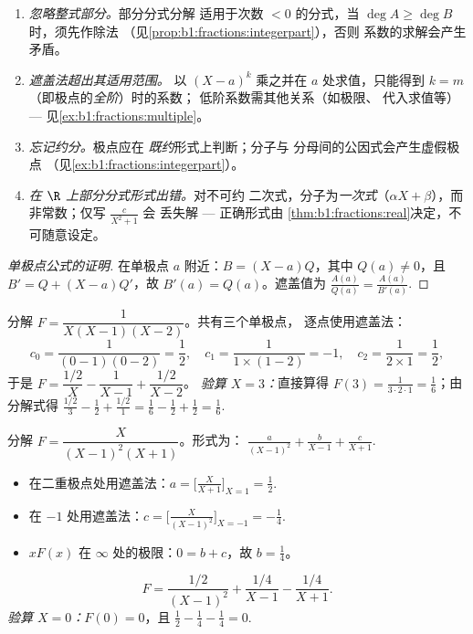 \begin{remark}[部分分式的常见易错点]\label{rem:b1:fractions:pitfalls}
\begin{enumerate}
  \item \emph{忽略整式部分。}部分分式分解
        适用于次数 $< 0$ 的分式，当 $\deg A \geq
        \deg B$ 时，须先作除法
        （见\cref{prop:b1:fractions:integerpart}），否则
        系数的求解会产生矛盾。
  \item \emph{遮盖法超出其适用范围。}
        以 $(X - a)^k$ 乘之并在 $a$ 处求值，只能得到
        $k = m$（即极点的\emph{全阶}）时的系数；
        低阶系数需其他关系（如极限、
        代入求值等） --- 见\cref{ex:b1:fractions:multiple}。
  \item \emph{忘记约分。}极点应在
        \emph{既约}形式上判断；分子与
        分母间的公因式会产生虚假极点
        （见\cref{ex:b1:fractions:integerpart}）。
  \item \emph{在 $\R$ 上部分分式形式出错。}对不可约
        二次式，分子为\emph{一次式}（$\alpha X +
        \beta$），而非常数；仅写 $\frac{c}{X^2 + 1}$ 会
        丢失解 --- 正确形式由
        \cref{thm:b1:fractions:real}决定，不可随意设定。
\end{enumerate}
\end{remark}

\begin{proof}[单极点公式的证明]
在单极点 $a$ 附近：$B = (X - a) Q$，其中 $Q(a) \neq 0$，且 $B' =
Q + (X - a) Q'$，故 $B'(a) = Q(a)$。遮盖值为
$\frac{A(a)}{Q(a)} = \frac{A(a)}{B'(a)}$.
\end{proof}

\begin{example}\label{ex:b1:fractions:simple}
分解 $F = \dfrac{1}{X(X-1)(X-2)}$。共有三个单极点，
逐点使用遮盖法：
\[
c_0 = \frac{1}{(0-1)(0-2)} = \frac12,
\quad
c_1 = \frac{1}{1 \times (1 - 2)} = -1,
\quad
c_2 = \frac{1}{2 \times 1} = \frac12,
\]
于是 $F = \dfrac{1/2}{X} - \dfrac{1}{X-1} + \dfrac{1/2}{X-2}$。
\emph{验算 $X = 3$：}直接算得 $F(3) = \frac{1}{3\cdot2\cdot1} =
\frac16$；由分解式得 $\frac{1/2}{3} - \frac{1}{2} +
\frac{1/2}{1} = \frac16 - \frac12 + \frac12 = \frac16$.
\end{example}

\begin{example}[重极点]\label{ex:b1:fractions:multiple}
分解 $F = \dfrac{X}{(X-1)^2 (X+1)}$。形式为：
$\frac{a}{(X-1)^2} + \frac{b}{X-1} + \frac{c}{X+1}$.
\begin{itemize}
  \item 在二重极点处用遮盖法：$a = \bigl[\frac{X}{X+1}\bigr]_{X=1}
        = \frac12$.
  \item 在 $-1$ 处用遮盖法：$c = \bigl[\frac{X}{(X-1)^2}\bigr]_{X=-1} =
        -\frac14$.
  \item $xF(x)$ 在 $\infty$ 处的极限：$0 = b + c$，故 $b = \frac14$。
\end{itemize}
\[
F = \frac{1/2}{(X-1)^2} + \frac{1/4}{X-1} - \frac{1/4}{X+1} .
\]
\emph{验算 $X = 0$：}$F(0) = 0$，且 $\frac12 - \frac14 - \frac14
= 0$.
\end{example}

